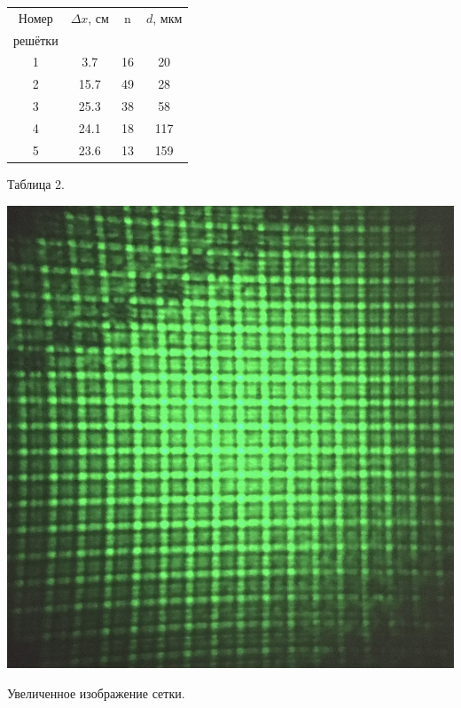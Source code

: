 \begin{minipage}{0.47\textwidth}
\begin{center}
\begin{tabular}{|c|c|c|c|}
\hline
Номер &$\Delta x$, см &  n&$d$, мкм\\
решётки&		&			& \\
\hline
1 &	3.7	&	16	& 	20		\\
\hline
2&	15.7	&	49	&	28		\\
\hline
3&	25.3	&	38	&	58		\\
\hline
4&	24.1	&	18	&	117		\\
\hline
5&	23.6	&	13	&	159	 	\\
\hline
\end{tabular}
\newline
\newline
Таблица 2. 
\end{center}
\end{minipage}
\begin{minipage}{0.47\textwidth}
\begin{center}
\includegraphics[width = \textwidth]{3.JPG}
\end{center}

\begin{center}
Увеличенное изображение сетки.
\end{center}
\end{minipage}

